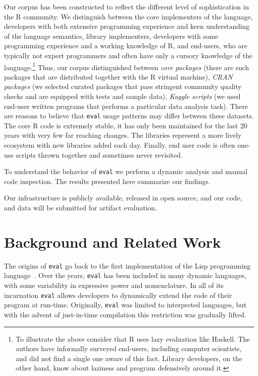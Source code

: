 \documentclass[USenglish,cleveref, autoref, thm-restate]{lipics-v2019}
\newcommand{\eval}{\texttt{eval}\xspace}
\begin{document}
Our corpus has been constructed to reflect the different level of
sophistication in the R community. We distinguish between the core
implementers of the language, developers with both extensive programming
experience and keen understanding of the language semantics, library
implementers, developers with some programming experience and a working
knowledge of R, and end-users, who are typically not expert programmers and
often have only a cursory knowledge of the language.\footnote{To illustrate
  the above consider that R uses lazy evaluation like Haskell. The authors
  have informally surveyed end-users, including computer scientists, and did
  not find a single one aware of this fact. Library developers, on the other
  hand, know about laziness and program defensively around it.}  Thus, our
corpus distinguished between \emph{core packages} (there are
\CorpusCorePackages such packages that are distributed together with the R
virtual machine), \emph{CRAN packages} (we selected \CorpusPackages curated
packages that pass stringent community quality checks and are equipped with
tests and sample data), \emph{Kaggle scripts} (we used \CorpusFinishedKaggle
end-user written programs that performs a particular data analysis
task). There are reasons to believe that \eval usage patterns may differ
between these datasets. The core R code is extremely stable, it has only
been maintained for the last 20 years with very few far reaching
changes. The libraries represent a more lively ecosystem with new libraries
added each day.  Finally, end user code is often one-use scripts thrown
together and sometimes never revisited.


To understand the behavior of \eval we perform a dynamic analysis and manual
code inspection. The results presented here summarize our findings.

Our infrastructure is publicly available, released in open source, and our
code, and data will be submitted for artifact evaluation.


\section{Background and Related Work}

The origins of \eval go back to the first implementation of the Lisp
programming language~\cite{lisp}. Over the years, \eval has been included in
many dynamic languages, with some variability in expressive power and
nomenclature. In all of its incarnation \eval allows developers to
dynamically extend the code of their program at run-time.  Originally, \eval
was limited to interpreted languages, but with the advent of just-in-time
compilation this restriction was gradually lifted.
\end{document}

